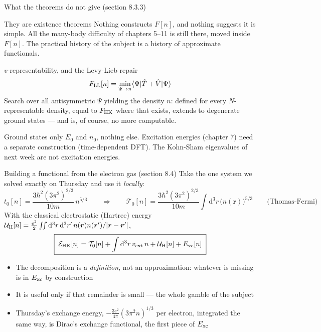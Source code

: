 \documentclass[aspectratio=169,10pt]{beamer}
\newcommand{\element}[3]{\langle #1\vert #2\vert #3\rangle}
\newcommand{\dd}{\mathrm{d}}
\begin{document}
\begin{frame}{What the theorems do not give (section 8.3.3)}
  \small
  \begin{block}{They are existence theorems}
    Nothing constructs $F[n]$, and nothing suggests it is simple. All the many-body difficulty of chapters 5--11 is still there, moved inside $F[n]$. The practical history of the subject is a history of \alert{approximate functionals}.
  \end{block}
  \begin{block}{$v$-representability, and the Levy-Lieb repair}
    \[
      F_{\rm LL}[n]=\min_{\Psi\to n}\element\Psi{\hat T+\hat V}\Psi
    \]
    Search over all antisymmetric $\Psi$ yielding the density $n$: defined for every $N$-representable density, equal to $F_{\rm HK}$ where that exists, extends to degenerate ground states --- and is, of course, no more computable.
  \end{block}
  \begin{block}{Ground states only}
    $E_0$ and $n_0$, nothing else. Excitation energies (chapter 7) need a separate construction (time-dependent DFT). The Kohn-Sham eigenvalues of next week are \alert{not} excitation energies.
  \end{block}
\end{frame}

\begin{frame}{Building a functional from the electron gas (section 8.4)}
  \small
  Take the one system we solved exactly on Thursday and use it \emph{locally}:
  \[
    t_0[n]=\frac{3\hbar^2(3\pi^2)^{2/3}}{10m}\,n^{5/3}
    \qquad\Longrightarrow\qquad
    \mathcal T_0[n]=\frac{3\hbar^2(3\pi^2)^{2/3}}{10m}\int\dd^3r\,\bigl(n(\bm r)\bigr)^{5/3}
    \qquad\text{(Thomas-Fermi)}
  \]
  With the classical electrostatic (Hartree) energy $\mathcal U_{\rm H}[n]=\frac{e^2}{2}\iint\dd^3r\,\dd^3r'\,n(\bm r)n(\bm r')/|\bm r-\bm r'|$,
  \[
    \boxed{\;\mathcal E_{\rm HK}[n]=\mathcal T_0[n]+\int\dd^3r\,v_{\rm ext}\,n+\mathcal U_{\rm H}[n]+E_{\rm xc}[n]\;}
  \]
  \begin{itemize}
    \item The decomposition is a \emph{definition}, not an approximation: whatever is missing is in $E_{\rm xc}$ by construction
    \item It is useful only if that remainder is small --- \alert{the whole gamble of the subject}
    \item Thursday's exchange energy, $-\frac{3e^2}{4\pi}(3\pi^2n)^{1/3}$ per electron, integrated the same way, is Dirac's exchange functional, the first piece of $E_{\rm xc}$
  \end{itemize}
\end{frame}
\end{document}
